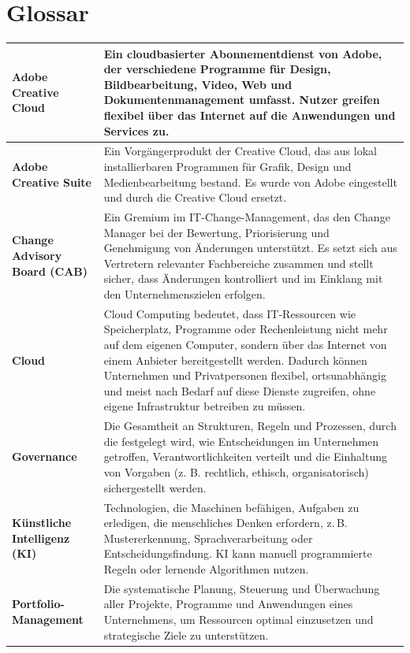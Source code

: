 \documentclass[
    12pt, 
    a4paper,
    ]{scrartcl} %
\begin{document}
\section*{Glossar}
\vspace{0.6cm}
\begin{tabular}{p{4cm} p{11.35cm}}   
    \hline
    \textbf{\normalsize Adobe Creative Cloud} & \normalsize Ein cloudbasierter Abonnementdienst von Adobe, der verschiedene Programme für Design, Bildbearbeitung, Video, Web und Dokumentenmanagement umfasst. Nutzer greifen flexibel über das Internet auf die Anwendungen und Services zu. \\[0.5cm]
    \hline
    \textbf{\normalsize Adobe Creative Suite} & \normalsize Ein Vorgängerprodukt der Creative Cloud, das aus lokal installierbaren Programmen für Grafik, Design und Medienbearbeitung bestand. Es wurde von Adobe eingestellt und durch die Creative Cloud ersetzt. \\[0.5cm]
    \hline
     \textbf{\normalsize Change Advisory Board (CAB)} & \normalsize Ein Gremium im IT-Change-Management, das den Change Manager bei der Bewertung, Priorisierung und Genehmigung von Änderungen unterstützt. Es setzt sich aus Vertretern relevanter Fachbereiche zusammen und stellt sicher, dass Änderungen kontrolliert und im Einklang mit den Unternehmenszielen erfolgen. \\[0.5cm]
    \hline
    \textbf{\normalsize Cloud} & \normalsize Cloud Computing bedeutet, dass IT-Ressourcen wie Speicherplatz, Programme oder Rechenleistung nicht mehr auf dem eigenen Computer, sondern über das Internet von einem Anbieter bereitgestellt werden. Dadurch können Unternehmen und Privatpersonen flexibel, ortsunabhängig und meist nach Bedarf auf diese Dienste zugreifen, ohne eigene Infrastruktur betreiben zu müssen. \\[0.5cm]
    \hline
     \textbf{\normalsize Governance} & \normalsize Die Gesamtheit an Strukturen, Regeln und Prozessen, durch die festgelegt wird, wie Entscheidungen im Unternehmen getroffen, Verantwortlichkeiten verteilt und die Einhaltung von Vorgaben (z. B. rechtlich, ethisch, organisatorisch) sichergestellt werden. \\[0.5cm]
    \hline
    \textbf{\normalsize Künstliche Intelligenz (KI)} & \normalsize Technologien, die Maschinen befähigen, Aufgaben zu erledigen, die menschliches Denken erfordern, z.\,B. Mustererkennung, Sprachverarbeitung oder Entscheidungsfindung. KI kann manuell programmierte Regeln oder lernende Algorithmen nutzen. \\[0.5cm]
    \hline
    \textbf{\normalsize Portfolio-Management} & \normalsize Die systematische Planung, Steuerung und Überwachung aller Projekte, Programme und Anwendungen eines Unternehmens, um Ressourcen optimal einzusetzen und strategische Ziele zu unterstützen. \\[0.5cm]
    \end{tabular}
\end{document}
